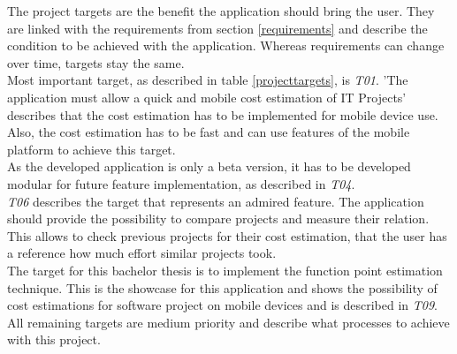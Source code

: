 The project targets are the benefit the application should bring the user. They are linked with the requirements from section \ref{requirements} and describe the condition to be achieved with the application. Whereas requirements can change over time, targets stay the same.\\
Most important target, as described in table \ref{projecttargets}, is \textit{T01}. 'The application must allow a quick and mobile cost estimation of IT Projects' describes that the cost estimation has to be implemented for mobile device use. Also, the cost estimation has to be fast and can use features of the mobile platform to achieve this target.\\
As the developed application is only a beta version, it has to be developed modular for future feature implementation, as described in \textit{T04}.\\
\textit{T06} describes the target that represents an admired feature. The application should provide the possibility to compare projects and measure their relation. This allows to check previous projects for their cost estimation, that the user has a reference how much effort similar projects took.\\
The target for this bachelor thesis is to implement the function point estimation technique. This is the showcase for this application and shows the possibility of cost estimations for software project on mobile devices and is described in \textit{T09}.\\
All remaining targets are medium priority and describe what processes to achieve with this project.\\

